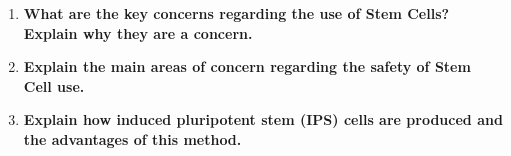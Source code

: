 \documentclass[a4paper]{article}
\begin{document}
\begin{enumerate}
    \item \textbf{What are the key concerns regarding the use of Stem Cells? Explain why they are a concern.}


    \item \textbf{Explain the main areas of concern regarding the safety of Stem Cell use.}


    \item \textbf{Explain how induced pluripotent stem (IPS) cells are produced and the advantages of this method.}


\end{enumerate}

\medskip



\end{document}
